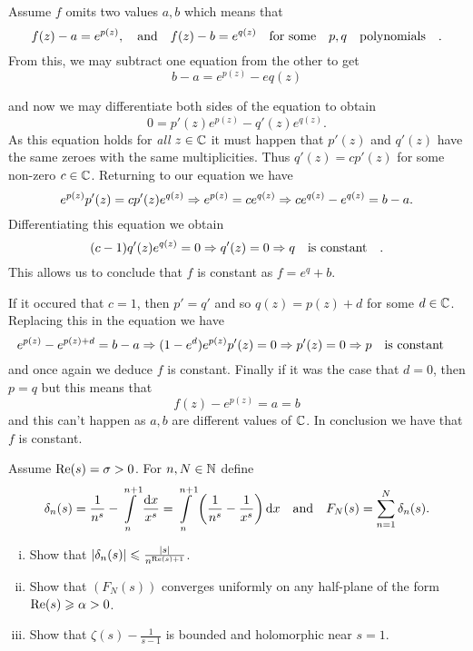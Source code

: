 \documentclass[12pt]{memoir}
\begin{document}
\begin{ptcbr}
Assume $f$ omits two values $a,b$ which means that 
$$f(z)-a=e^{p(z)},\quad\text{and}\quad f(z)-b=e^{q(z)}\quad\text{for some}\quad p,q\quad\text{polynomials}\quad.$$
From this, we may subtract one equation from the other to get 
$$b-a=e^{p(z)}-e{q(z)}$$
\iffalse
and now taking the limit as $z\to\infty$ on both sides we see that 
$$\lim_{z\to\infty}(e^{p(z)}-e{q(z)})=b-a$$
is finite limit. 
\fi
and now we may differentiate both sides of the equation to obtain 
$$0=p'(z)e^{p(z)}-q'(z)e^{q(z)}.$$
As this equation holds for \emph{all} $z\in\mathbb{C}$ it must happen that $p'(z)$ and $q'(z)$ have the same zeroes with the same multiplicities. Thus $q'(z)=cp'(z)$ for some non-zero $c\in\mathbb{C}$. Returning to our equation we have 
$$e^{p(z)}p'(z)=cp'(z)e^{q(z)}\Rightarrow e^{p(z)}=ce^{q(z)}\Rightarrow ce^{q(z)}-e^{q(z)}=b-a.$$
Differentiating this equation we obtain 
$$(c-1)q'(z)e^{q(z)}=0\Rightarrow q'(z)=0\Rightarrow q\quad\text{is constant}\quad.$$
This allows us to conclude that $f$ is constant as $f=e^q+b$.\par 
If it occured that $c=1$, then $p'=q'$ and so $q(z)=p(z)+d$ for some $d\in\mathbb{C}$. Replacing this in the equation we have 
$$e^{p(z)}-e^{p(z)+d}=b-a\Rightarrow(1-e^d)e^{p(z)}p'(z)=0\Rightarrow p'(z)=0\Rightarrow p\quad\text{is constant}\quad$$
and once again we deduce $f$ is constant. Finally if it was the case that $d=0$, then $p=q$ but this means that 
$$f(z)-e^{p(z)}=a=b$$ 
and this can't happen as $a,b$ are different values of $\mathbb{C}$. In conclusion we have that $f$ is constant.
   \end{ptcbr}

\begin{Ej}
   Assume $\Re(s)=\sigma>0$. For $n,N\in\mathbb{N}$ define 
   $$\delta_n(s)=\frac{1}{n^s}-\int\limits_n^{n+1}\frac{\dd x}{x^s}=\int\limits_n^{n+1}\left(\frac{1}{n^s}-\frac{1}{x^s}\right)\dd x\quad\text{and}\quad F_N(s)=\sum_{n=1}^{N}\delta_n(s).$$
   \begin{enumerate}[i)]
      \itemsep=-0.4em
      \item Show that $|\delta_n(s)|\leqslant\frac{|s|}{n^{\Re(s)+1}}$. 
      \item Show that $(F_N(s))$ converges uniformly on any half-plane of the form $\Re(s)\geqslant \alpha>0$.
      \item Show that $\zeta(s)-\frac{1}{s-1}$ is bounded and holomorphic near $s=1$. 
   \end{enumerate}
\end{Ej}
\end{document}
